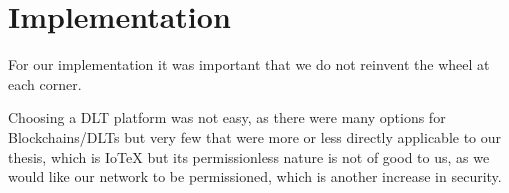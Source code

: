 \chapter{Implementation}

For our implementation it was important that we do not reinvent the wheel at each corner.

Choosing a DLT platform was not easy, as there were many options for Blockchains/DLTs but very few that were more or
less directly applicable to our thesis, which is IoTeX but its permissionless nature is not of good to us, as we would
like our network to be permissioned, which is another increase in security.
